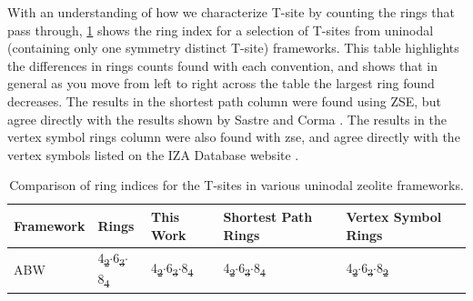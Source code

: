 \documentclass[preprint,numrefs,noinfo,sort&compress]{elsarticle}
\providecommand{\DIFadd}[1]{{\protect\color{blue}\uwave{#1}}} %
\providecommand{\DIFdel}[1]{{\protect\color{red}\sout{#1}}}                      %
\providecommand{\DIFaddFL}[1]{\DIFadd{#1}} %
\providecommand{\DIFdelFL}[1]{\DIFdel{#1}} %
\providecommand{\DIFaddbeginFL}{} %
\providecommand{\DIFaddendFL}{} %
\providecommand{\DIFdelbeginFL}{} %
\providecommand{\DIFdelendFL}{} %
\newcommand{\DIFscaledelfig}{0.5}
\newlength{\DIFdelgraphicswidth} %
\newlength{\DIFdelgraphicsheight} %
\newcommand{\DIFaddincludegraphics}[2][]{{\color{blue}\fbox{\DIFOincludegraphics[#1]{#2}}}} %
\newcommand{\DIFdelincludegraphics}[2][]{%
\sbox{\DIFdelgraphicsbox}{\DIFOincludegraphics[#1]{#2}}%
\settoboxwidth{\DIFdelgraphicswidth}{\DIFdelgraphicsbox} %
\settoboxtotalheight{\DIFdelgraphicsheight}{\DIFdelgraphicsbox} %
\scalebox{\DIFscaledelfig}{%
\parbox[b]{\DIFdelgraphicswidth}{\usebox{\DIFdelgraphicsbox}\\[-\baselineskip] \rule{\DIFdelgraphicswidth}{0em}}\llap{\resizebox{\DIFdelgraphicswidth}{\DIFdelgraphicsheight}{%
\setlength{\unitlength}{\DIFdelgraphicswidth}%
\begin{picture}(1,1)%
\thicklines\linethickness{2pt} %
{\color[rgb]{1,0,0}\put(0,0){\framebox(1,1){}}}%
{\color[rgb]{1,0,0}\put(0,0){\line( 1,1){1}}}%
{\color[rgb]{1,0,0}\put(0,1){\line(1,-1){1}}}%
\end{picture}%
}\hspace*{3pt}}} %
} %
\DeclareRobustCommand{\DIFaddbeginFL}{\DIFOaddbeginFL \let\includegraphics\DIFaddincludegraphics} %
\DeclareRobustCommand{\DIFaddendFL}{\DIFOaddendFL \let\includegraphics\DIFOincludegraphics} %
\DeclareRobustCommand{\DIFdelbeginFL}{\DIFOdelbeginFL \let\includegraphics\DIFdelincludegraphics} %
\DeclareRobustCommand{\DIFdelendFL}{\DIFOaddendFL \let\includegraphics\DIFOincludegraphics} %
\begin{document}
With an understanding of how we characterize T-site by counting the rings that pass through, \cref{tab:uninodal} shows the ring index for a selection of T-sites from uninodal (containing only one symmetry distinct T-site) frameworks. This table highlights the differences in rings counts found with each convention, and shows that in general as you move from left to right across the table the largest ring found decreases. The results in the shortest path column were found using ZSE, but agree directly with the results shown by Sastre and Corma \cite{sastre-topological-2009}. The results in the vertex symbol rings column were also found with zse, and agree directly with the vertex symbols listed on the IZA Database website \cite{baerlocher-database-nodate}.  

\begin{table}
\centering
\begin{threeparttable}
\caption{Comparison of ring indices for the T-sites in various uninodal zeolite frameworks. \label{tab:uninodal}}
{\scriptsize
\begin{tabular}{lllll}
\hline
Framework & Rings & This Work & Shortest Path Rings \cite{sastre-topological-2009} & Vertex Symbol Rings \cite{baerlocher-database-nodate}\\
\hline
ABW & 4\DIFdelbeginFL \DIFdelFL{\textsubscript{2}\(\cdot\)}\DIFdelendFL \DIFaddbeginFL \DIFaddFL{\(_{\text{2}} \cdot\)}\DIFaddendFL 6\DIFdelbeginFL \DIFdelFL{\textsubscript{3}\(\cdot\)}\DIFdelendFL \DIFaddbeginFL \DIFaddFL{\(_{\text{3}} \cdot\)}\DIFaddendFL 8\DIFdelbeginFL \DIFdelFL{\textsubscript{4} }\DIFdelendFL \DIFaddbeginFL \DIFaddFL{\(_{\text{4}}\) }\DIFaddendFL & 4\DIFdelbeginFL \DIFdelFL{\textsubscript{2}\(\cdot\)}\DIFdelendFL \DIFaddbeginFL \DIFaddFL{\(_{\text{2}} \cdot\)}\DIFaddendFL 6\DIFdelbeginFL \DIFdelFL{\textsubscript{3}\(\cdot\)}\DIFdelendFL \DIFaddbeginFL \DIFaddFL{\(_{\text{3}} \cdot\)}\DIFaddendFL 8\DIFdelbeginFL \DIFdelFL{\textsubscript{4} }\DIFdelendFL \DIFaddbeginFL \DIFaddFL{\(_{\text{4}}\) }\DIFaddendFL & 4\DIFdelbeginFL \DIFdelFL{\textsubscript{2}\(\cdot\)}\DIFdelendFL \DIFaddbeginFL \DIFaddFL{\(_{\text{2}} \cdot\)}\DIFaddendFL 6\DIFdelbeginFL \DIFdelFL{\textsubscript{3}\(\cdot\)}\DIFdelendFL \DIFaddbeginFL \DIFaddFL{\(_{\text{3}} \cdot\)}\DIFaddendFL 8\DIFdelbeginFL \DIFdelFL{\textsubscript{4} }\DIFdelendFL \DIFaddbeginFL \DIFaddFL{\(_{\text{4}}\) }\DIFaddendFL & 4\DIFdelbeginFL \DIFdelFL{\textsubscript{2}\(\cdot\)}\DIFdelendFL \DIFaddbeginFL \DIFaddFL{\(_{\text{2}} \cdot\)}\DIFaddendFL 6\DIFdelbeginFL \DIFdelFL{\textsubscript{3}\(\cdot\)}\DIFdelendFL \DIFaddbeginFL \DIFaddFL{\(_{\text{3}} \cdot\)}\DIFaddendFL 8\DIFdelbeginFL \DIFdelFL{\textsubscript{2}}\DIFdelendFL \DIFaddbeginFL \DIFaddFL{\(_{\text{2}}\)}\DIFaddendFL \\

\end{tabular}}
\end{threeparttable}
\end{table}
\end{document}
